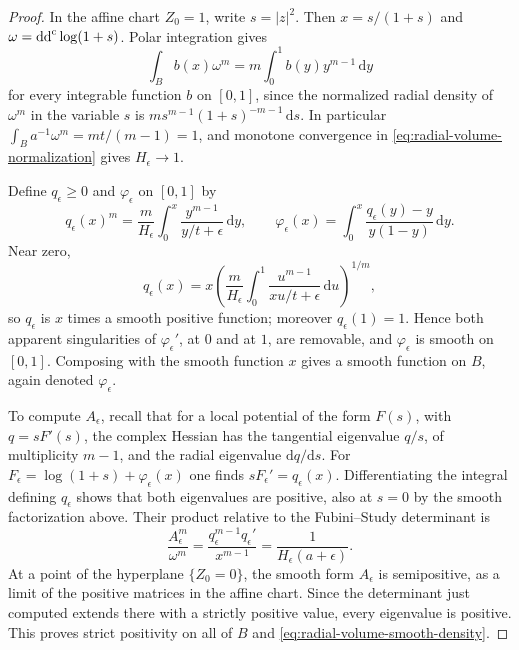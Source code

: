 \begin{proof}
In the affine chart $Z_0=1$, write $s=|z|^2$. Then $x=s/(1+s)$ and $\omega=\mathrm{dd}^{\mathrm{c}}\log(1+s)$. Polar integration gives
\begin{equation}\label{eq:radial-volume-integration}
 \int_B b(x)\omega^m=m\int_0^1 b(y)y^{m-1}\,\mathrm{d}y
\end{equation}
for every integrable function $b$ on $[0,1]$, since the normalized radial density of $\omega^m$ in the variable $s$ is $m s^{m-1}(1+s)^{-m-1}\,\mathrm{d}s$. In particular $\int_B a^{-1}\omega^m=mt/(m-1)=1$, and monotone convergence in \eqref{eq:radial-volume-normalization} gives $H_\epsilon\to1$.

Define $q_\epsilon\geq0$ and $\varphi_\epsilon$ on $[0,1]$ by
\[
 q_\epsilon(x)^m=\frac m{H_\epsilon}
       \int_0^x\frac{y^{m-1}}{y/t+\epsilon}\,\mathrm{d}y,
 \qquad
 \varphi_\epsilon(x)=\int_0^x
       \frac{q_\epsilon(y)-y}{y(1-y)}\,\mathrm{d}y.
\]
Near zero,
\[
 q_\epsilon(x)=x\left(\frac m{H_\epsilon}
       \int_0^1\frac{u^{m-1}}{xu/t+\epsilon}\,\mathrm{d}u\right)^{1/m},
\]
so $q_\epsilon$ is $x$ times a smooth positive function; moreover $q_\epsilon(1)=1$. Hence both apparent singularities of $\varphi_\epsilon'$, at $0$ and at $1$, are removable, and $\varphi_\epsilon$ is smooth on $[0,1]$. Composing with the smooth function $x$ gives a smooth function on $B$, again denoted $\varphi_\epsilon$.

To compute $A_\epsilon$, recall that for a local potential of the form $F(s)$, with $q=sF'(s)$, the complex Hessian has the tangential eigenvalue $q/s$, of multiplicity $m-1$, and the radial eigenvalue $\mathrm{d}q/\mathrm{d}s$. For $F_\epsilon=\log(1+s)+\varphi_\epsilon(x)$ one finds $sF_\epsilon'=q_\epsilon(x)$. Differentiating the integral defining $q_\epsilon$ shows that both eigenvalues are positive, also at $s=0$ by the smooth factorization above. Their product relative to the Fubini--Study determinant is
\[
 \frac{A_\epsilon^m}{\omega^m}
 =\frac{q_\epsilon^{m-1}q_\epsilon'}{x^{m-1}}
 =\frac1{H_\epsilon(a+\epsilon)}.
\]
At a point of the hyperplane $\{Z_0=0\}$, the smooth form $A_\epsilon$ is semipositive, as a limit of the positive matrices in the affine chart. Since the determinant just computed extends there with a strictly positive value, every eigenvalue is positive. This proves strict positivity on all of $B$ and \eqref{eq:radial-volume-smooth-density}.


\end{proof}
